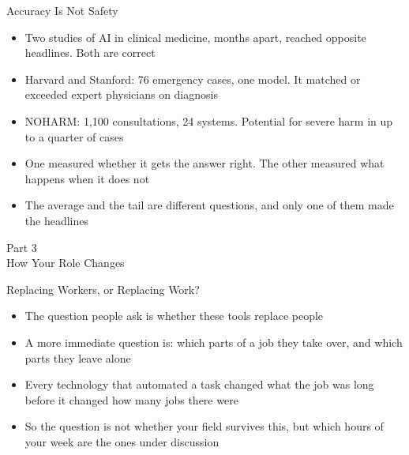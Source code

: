 \documentclass[aspectratio=169]{beamer}
\begin{document}
\begin{frame}{Accuracy Is Not Safety}
    \begin{itemize}\setlength{\itemsep}{7pt}
        \item Two studies of AI in clinical medicine, months apart, reached opposite
              headlines. Both are correct
        \item Harvard and Stanford: 76 emergency cases, one model. It matched or exceeded
              expert physicians on diagnosis
        \item NOHARM: 1,100 consultations, 24 systems. Potential for severe harm in up to a
              quarter of cases
        \item One measured whether it gets the answer right. The other measured what happens
              when it does not
        \item The average and the tail are different questions, and only one of them made the
              headlines
    \end{itemize}
\end{frame}


\begin{frame}[plain]
    \vfill
    \begin{center}
        {\Huge Part 3}\\[0.8em]
        {\Large How Your Role Changes}
    \end{center}
    \vfill
\end{frame}

\begin{frame}{Replacing Workers, or Replacing Work?}
    \begin{itemize}\setlength{\itemsep}{8pt}
        \item The question people ask is whether these tools replace people
        \item A more immediate question is: which parts of a job they take over, and which
              parts they leave alone
        \item Every technology that automated a task changed what the job was long before it
              changed how many jobs there were
        \item So the question is not whether your field survives this, but which hours of
              your week are the ones under discussion
    \end{itemize}
\end{frame}
\end{document}
